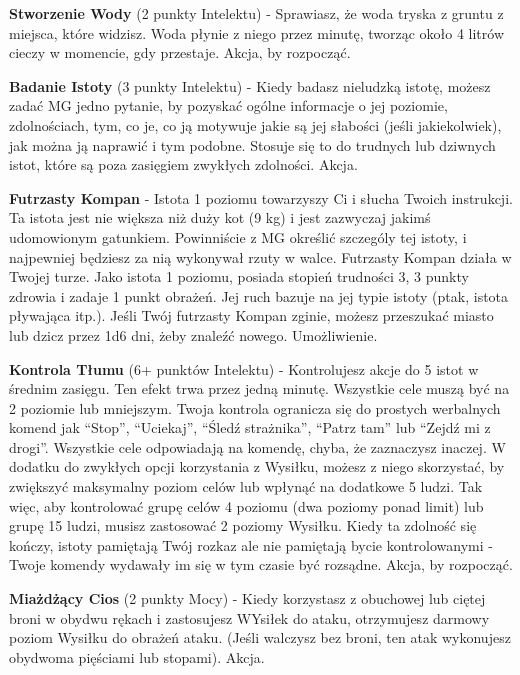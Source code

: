 {\textbf{Stworzenie Wody}\label{sec:Stworzenie Wody} (2 punkty Intelektu) - Sprawiasz, że woda tryska z gruntu z miejsca, które widzisz. Woda płynie z niego przez minutę, tworząc około 4 litrów cieczy w momencie, gdy przestaje. Akcja, by rozpocząć. 

\textbf{Badanie Istoty}\label{sec:Badanie Istoty} (3 punkty Intelektu) - Kiedy badasz nieludzką istotę, możesz zadać MG jedno pytanie, by pozyskać ogólne informacje o jej poziomie, zdolnościach, tym, co je, co ją motywuje jakie są jej słabości (jeśli jakiekolwiek), jak można ją naprawić i tym podobne. Stosuje się to do trudnych lub dziwnych istot, które są poza zasięgiem zwykłych zdolności. Akcja. 

\textbf{Futrzasty Kompan}\label{sec:Futrzasty Kompan} - Istota 1 poziomu towarzyszy Ci i słucha Twoich instrukcji. Ta istota jest nie większa niż duży kot (9 kg) i jest zazwyczaj jakimś udomowionym gatunkiem. Powinniście z MG określić szczególy tej istoty, i najpewniej będziesz za nią wykonywał rzuty w walce. Futrzasty Kompan działa w Twojej turze. Jako istota 1 poziomu, posiada stopień trudności 3, 3 punkty zdrowia i zadaje 1 punkt obrażeń. Jej ruch bazuje na jej typie istoty (ptak, istota pływająca itp.). Jeśli Twój futrzasty Kompan zginie, możesz przeszukać miasto lub dzicz przez 1d6 dni, żeby znaleźć nowego. Umożliwienie. 

\textbf{Kontrola Tłumu}\label{sec:Kontrola Tłumu} (6+ punktów Intelektu) - Kontrolujesz akcje do 5 istot w średnim zasięgu. Ten efekt trwa przez jedną minutę. Wszystkie cele muszą być na 2 poziomie lub mniejszym. Twoja kontrola ogranicza się do prostych werbalnych komend jak ``Stop'', ``Uciekaj'', ``Śledź strażnika'', ``Patrz tam'' lub ``Zejdź mi z drogi''. Wszystkie cele odpowiadają na komendę, chyba, że zaznaczysz inaczej. W dodatku do zwykłych opcji korzystania z Wysiłku, możesz z niego skorzystać, by zwiększyć maksymalny poziom celów lub wpłynąć na dodatkowe 5 ludzi. Tak więc, aby kontrolować grupę celów 4 poziomu (dwa poziomy ponad limit) lub grupę 15 ludzi, musisz zastosować 2 poziomy Wysiłku.  Kiedy ta zdolność się kończy, istoty pamiętają Twój rozkaz ale nie pamiętają bycie kontrolowanymi - Twoje komendy wydawały im się w tym czasie być rozsądne. Akcja, by rozpocząć. 

\textbf{Miażdżący Cios}\label{sec:Miażdżący Cios} (2 punkty Mocy) - Kiedy korzystasz z obuchowej lub ciętej broni w obydwu rękach i zastosujesz WYsiłek do ataku, otrzymujesz darmowy poziom Wysiłku do obrażeń ataku. (Jeśli walczysz bez broni, ten atak wykonujesz obydwoma pięściami lub stopami). Akcja.

}

